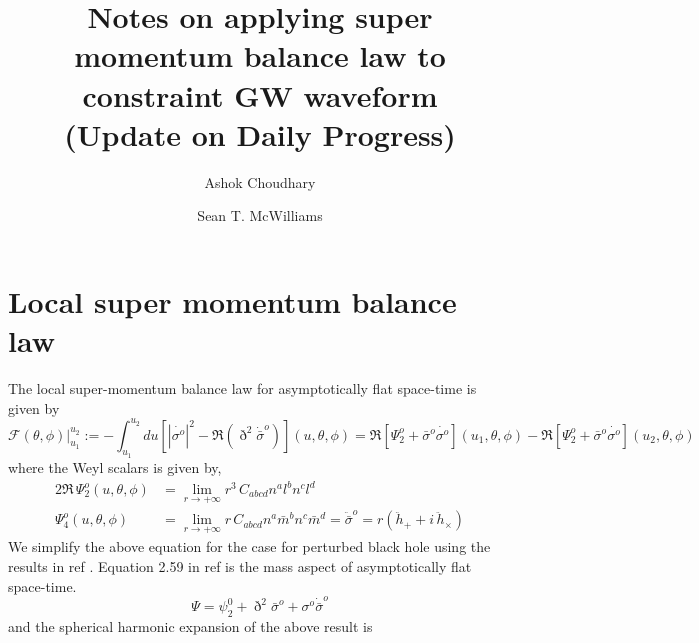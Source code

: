 \documentclass[prd,preprintnumbers,onecolumn,eqsecnum,floatfix,letter]{revtex4}
\begin{document}
\newcommand{\be}{\begin{equation}}
\newcommand{\ee}{\end{equation}}
\newcommand{\ber}{\begin{eqnarray}}
\newcommand{\eer}{\end{eqnarray}}
\def\bea{\begin{eqnarray}}
\def\eea{\end{eqnarray}}
\newcommand{\etal}{\emph{et al.}}


\title{Notes on applying super momentum balance law to constraint GW waveform \\ (Update on Daily Progress) }
\author{Ashok Choudhary}
\author{Sean T. McWilliams}

\begin{abstract}
\end{abstract}

\maketitle

\section{Local super momentum balance law}

The local super-momentum balance law for asymptotically flat space-time is given by 
\begin{equation}
\mathcal{F}(\theta,\phi) \Big|^{u_{2}}_{u_{1}}  := -\int_{u_{1}}^{u_{2}} du \left[|\dot{\sigma^{o}}|^{2} - \Re\left(\eth^{2}\dot{\bar{\sigma}}^{o} \right) \right](u, \theta, \phi) = \Re\left[\Psi^{o}_{2} + \bar{\sigma}^{o}\dot{\sigma^{o}}\right]\left(u_{1}, \theta, \phi\right) - \Re\left[\Psi^{o}_{2} + \bar{\sigma}^{o}\dot{\sigma^{o}}\right]\left(u_{2}, \theta, \phi\right) 
\end{equation}
where the Weyl scalars is given by,
\begin{align}
	2 \Re\, \Psi^{o}_{2}\left(u, \theta, \phi \right) & = \lim_{r \to +\infty} r^{3} \, C_{abcd}n^{a}l^{b}n^{c}l^{d}\label{psi2}\\  \Psi^{o}_{4}\left(u, \theta, \phi \right) & = \lim_{r \to +\infty} r \, C_{abcd}n^{a}\bar{m}^{b}n^{c} \bar{m}^{d} = \ddot{\bar{\sigma}}^{o} = r\left(\ddot{h}_{+} + i\, \ddot{h}_{\times}  \right)
	\label{psi4}
\end{align}
We simplify the above equation for the case for perturbed black hole using the results in ref \cite{Adamo_2009}. Equation 2.59 in ref\cite{Adamo_2009} is the mass aspect of asymptotically flat space-time. 
\begin{equation}
	\Psi = \psi^{0}_{2} + \eth^{2}\bar{\sigma}^{o} + {\sigma}^{o}\dot{\bar{\sigma}}^{o}
\end{equation}
and the spherical harmonic expansion of the above result is
\end{document}
